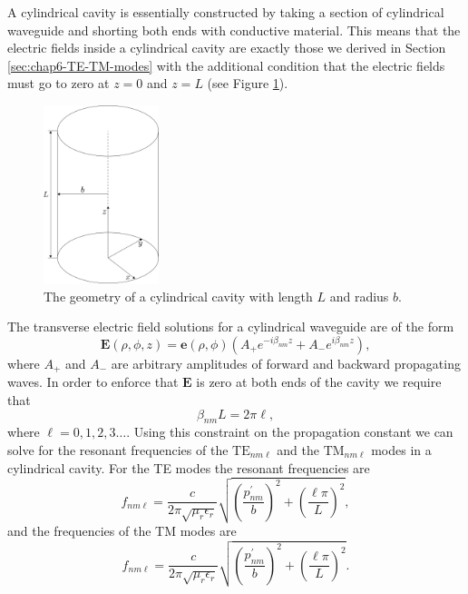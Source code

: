 A cylindrical cavity is essentially constructed by taking a section of cylindrical waveguide and shorting both ends with conductive material. This means that the electric fields inside a cylindrical cavity are exactly those we derived in Section \ref{sec:chap6-TE-TM-modes} with the additional condition that the electric fields must go to zero at $z=0$ and $z=L$ (see Figure \ref{fig:chap6-cyl-cav}).
\begin{figure}[htbp]
    \centering
    \includegraphics*[width=0.3\textwidth]{figs/Chapter-6/230606_cylindrical_cavity.png}
    \caption{\label{fig:chap6-cyl-cav} The geometry of a cylindrical cavity with length $L$ and radius $b$.}
\end{figure}

The transverse electric field solutions for a cylindrical waveguide are of the form
\begin{equation}
    \bm{E}(\rho,\phi,z)=\bm{e}(\rho,\phi)\left(A_+e^{-i\beta_{nm}z}+A_-e^{i\beta_{nm}z }\right),
\end{equation}
where $A_+$ and $A_-$ are arbitrary amplitudes of forward and backward propagating waves. In order to enforce that $\bm{E}$ is zero at both ends of the cavity we require that 
\begin{equation}
    \beta_{nm}L = 2\pi \ell,
\end{equation}
where $\ell=0,1,2,3\ldots$. Using this constraint on the propagation constant we can solve for the resonant frequencies of the $\mathrm{TE}_{nm\ell}$ and the $\mathrm{TM}_{nm\ell}$ modes in a cylindrical cavity. For the TE modes the resonant frequencies are
\begin{equation}
    f_{nm\ell}=\frac{c}{2\pi\sqrt{\mu_r\epsilon_r}}\sqrt{\left(\frac{p_{nm}^\prime}{b}\right)^2+\left(\frac{\ell\pi}{L}\right)^2},
\end{equation}
and the frequencies of the TM modes are 
\begin{equation}
    f_{nm\ell}=\frac{c}{2\pi\sqrt{\mu_r\epsilon_r}}\sqrt{\left(\frac{p_{nm}^\prime}{b}\right)^2+\left(\frac{\ell\pi}{L}\right)^2}.
\end{equation}

